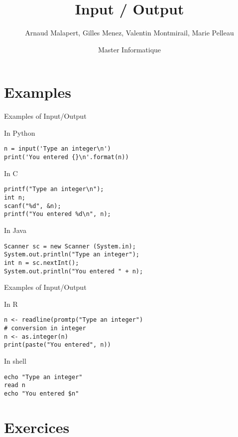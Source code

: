 \documentclass{beamer}
\title{Input / Output}
\author[]{Arnaud Malapert, Gilles Menez, Valentin Montmirail, Marie Pelleau}
\date[2018 - 2019]{Master Informatique}
\begin{document}
\frame{
  \titlepage
}

\section{Examples}

\begin{frame}[fragile]{Examples of Input/Output}
  
  \begin{block}{In Python}
    \begin{lstlisting}[style=codePy]
n = input('Type an integer\n')
print('You entered {}\n'.format(n))
    \end{lstlisting}
  \end{block}
  
  \begin{block}{In C}
    \begin{lstlisting}[style=codeC]
printf("Type an integer\n");
int n;
scanf("%d", &n);
printf("You entered %d\n", n);
    \end{lstlisting}
  \end{block}
  
  \begin{block}{In Java}
    \begin{lstlisting}[style=codeJ]
Scanner sc = new Scanner (System.in);
System.out.println("Type an integer");
int n = sc.nextInt();
System.out.println("You entered " + n);
    \end{lstlisting}
  \end{block}
  
\end{frame}

\begin{frame}[fragile]{Examples of Input/Output}
  
  \begin{block}{In R}
    \begin{lstlisting}[style=codeR]
n <- readline(promtp("Type an integer")
# conversion in integer
n <- as.integer(n)
print(paste("You entered", n))
    \end{lstlisting}
  \end{block}
  
  \begin{block}{In shell}
    \begin{lstlisting}[style=codeS]
echo "Type an integer"
read n
echo "You entered $n"
    \end{lstlisting}
  \end{block}
  
\end{frame}


\section{Exercices}
\end{document}
